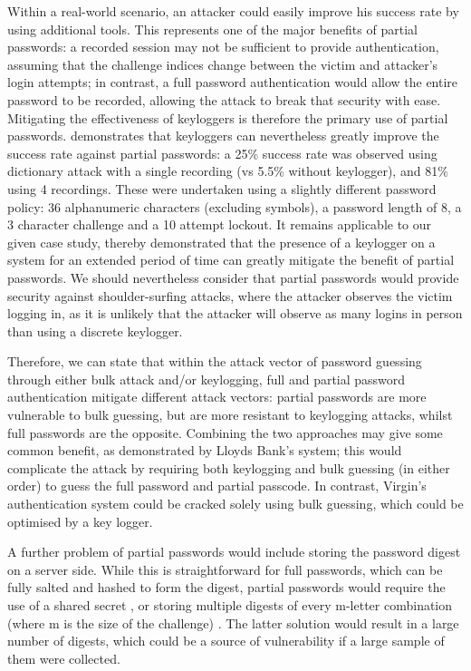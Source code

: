 \documentclass[british,10pt,a4paper]{article}
\begin{document}
Within a real-world scenario, an attacker could easily improve his success rate by using additional tools. This represents one of the major benefits of partial passwords: a recorded session may not be sufficient to provide authentication, assuming that the challenge indices change between the victim and attacker's login attempts; in contrast, a full password authentication would allow the entire password to be recorded, allowing the attack to break that security with ease. Mitigating the effectiveness of keyloggers is therefore the primary use of partial passwords. \citet{Aspinall2013-sh} demonstrates that keyloggers can nevertheless greatly improve the success rate against partial passwords: a 25\% success rate was observed using dictionary attack with a single recording (vs 5.5\% without keylogger), and 81\% using 4 recordings. These were undertaken using a slightly different password policy: 36 alphanumeric characters (excluding symbols), a password length of 8, a 3 character challenge and a 10 attempt lockout. It remains applicable to our given case study, thereby demonstrated that the presence of a keylogger on a system for an extended period of time can greatly mitigate the benefit of partial passwords. We should nevertheless consider that partial passwords would provide security against shoulder-surfing attacks, where the attacker observes the victim logging in, as it is unlikely that the attacker will observe as many logins in person than using a discrete keylogger. 

Therefore, we can state that within the attack vector of password guessing through either bulk attack and/or keylogging, full and partial password authentication mitigate different attack vectors: partial passwords are more vulnerable to bulk guessing, but are more resistant to keylogging attacks, whilst full passwords are the opposite. Combining the two approaches may give some common benefit, as demonstrated by Lloyds Bank's system; this would complicate the attack by requiring both keylogging and bulk guessing (in either order) to guess the full password and partial passcode. In contrast, Virgin's authentication system could be cracked solely using bulk guessing, which could be optimised by a key logger.

A further problem of partial passwords would include storing the password digest on a server side. While this is straightforward for full passwords, which can be fully salted and hashed to form the digest, partial passwords would require the use of a shared secret \cite{smartarchitect}, or storing multiple digests of every m-letter combination (where m is the size of the challenge) \cite{smartarchitect}. The latter solution would result in a large number of digests, which could be a source of vulnerability if a large sample of them were collected. 
\end{document}
